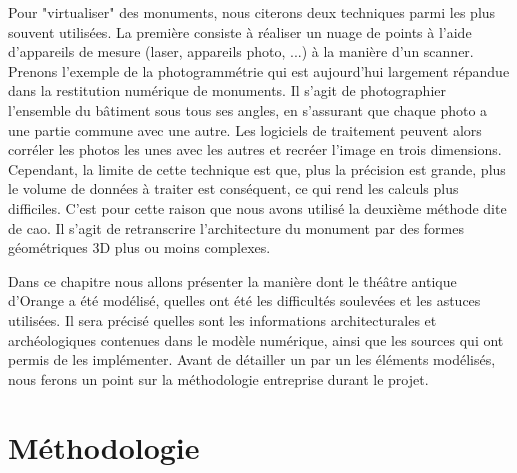 Pour "virtualiser" des monuments, nous citerons deux techniques parmi les plus souvent utilisées. La première consiste à réaliser un nuage de points à l'aide d'appareils de mesure (laser, appareils photo, ...) à la manière d'un scanner. Prenons l'exemple de la photogrammétrie qui est aujourd'hui largement répandue dans la restitution numérique de monuments. Il s'agit de photographier l'ensemble du bâtiment sous tous ses angles, en s'assurant que chaque photo a une partie commune avec une autre. Les logiciels de traitement peuvent alors corréler les photos les unes avec les autres et recréer l'image en trois dimensions. Cependant, la limite de cette technique est que, plus la précision est grande, plus le volume de données à traiter est conséquent, ce qui rend les calculs plus difficiles. C'est pour cette raison que nous avons utilisé la deuxième méthode dite de \gls{cao}. Il s'agit de retranscrire l'architecture du monument par des formes géométriques 3D plus ou moins complexes.

Dans ce chapitre nous allons présenter la manière dont le théâtre antique d'Orange a été modélisé, quelles ont été les difficultés soulevées et les astuces utilisées. Il sera précisé quelles sont les informations architecturales et archéologiques contenues dans le modèle numérique, ainsi que les sources qui ont permis de les implémenter.
Avant de détailler un par un les éléments modélisés, nous ferons un point sur la méthodologie entreprise durant le projet.


\section{Méthodologie} \label{sect_methodo}

